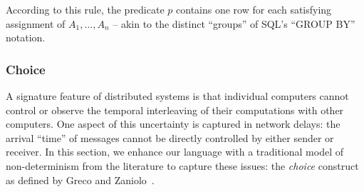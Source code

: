 \linebreak{}

According to this rule, the predicate $p$ contains one row for each satisfying assignment of $A_1, \ldots, A_n$ -- akin to the distinct ``groups'' of SQL's ``GROUP BY'' notation.





  









\subsubsection{Choice}
A signature feature of distributed systems is that individual computers cannot control or observe the temporal interleaving of their computations with other computers.  One aspect of this uncertainty is captured in network delays: the arrival ``time'' of messages cannot be directly controlled by either sender or receiver.  In this section, we enhance our language with a traditional model of non-determinism from the literature to capture these issues: the \emph{choice} construct as defined by Greco and Zaniolo~\cite{greedychoice}.

